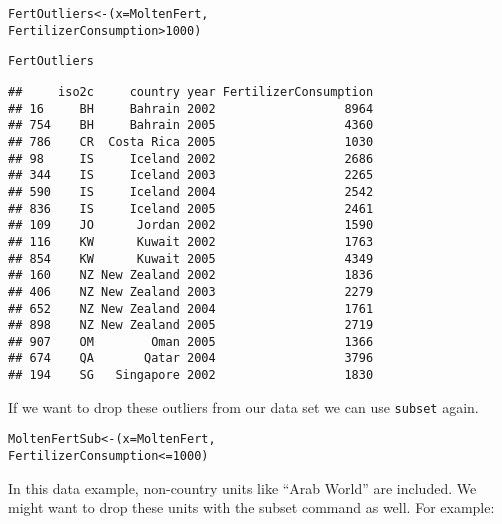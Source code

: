{\small
\begin{knitrout}
\color{fgcolor}\begin{kframe}
\begin{alltt}
FertOutliers <- (x = MoltenFert, 
                        FertilizerConsumption > 1000)

FertOutliers
\end{alltt}
\begin{verbatim}
##     iso2c     country year FertilizerConsumption
## 16     BH     Bahrain 2002                  8964
## 754    BH     Bahrain 2005                  4360
## 786    CR  Costa Rica 2005                  1030
## 98     IS     Iceland 2002                  2686
## 344    IS     Iceland 2003                  2265
## 590    IS     Iceland 2004                  2542
## 836    IS     Iceland 2005                  2461
## 109    JO      Jordan 2002                  1590
## 116    KW      Kuwait 2002                  1763
## 854    KW      Kuwait 2005                  4349
## 160    NZ New Zealand 2002                  1836
## 406    NZ New Zealand 2003                  2279
## 652    NZ New Zealand 2004                  1761
## 898    NZ New Zealand 2005                  2719
## 907    OM        Oman 2005                  1366
## 674    QA       Qatar 2004                  3796
## 194    SG   Singapore 2002                  1830
\end{verbatim}
\end{kframe}
\end{knitrout}

}

\noindent If we want to drop these outliers from our data set we can use \texttt{subset} again.

\begin{knitrout}
\color{fgcolor}\begin{kframe}
\begin{alltt}
MoltenFertSub <- (x = MoltenFert,
                        FertilizerConsumption <= 1000)
\end{alltt}
\end{kframe}
\end{knitrout}


In this data example, non-country units like ``Arab World'' are included. We might want to drop these units with the subset command as well. For example:

